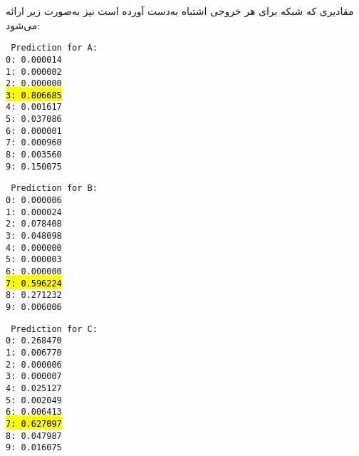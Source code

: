 مقادیری که شبکه برای هر خروجی اشتباه به‌دست آورده است نیز به‌صورت زیر ارائه می‌شود: \newpage


\begin{latin}
	\noindent\begin{multicols}{3}
		\texttt{%
			Prediction for A:\\
			0: 0.000014\\
			1: 0.000002\\
			2: 0.000000\\
			\hl{3: 0.806685}\\
			4: 0.001617\\
			5: 0.037086\\
			6: 0.000001\\
			7: 0.000960\\
			8: 0.003560\\
			9: 0.150075
		}
		
		\vfill %
		
		\texttt{%
			Prediction for B:\\
			0: 0.000006\\
			1: 0.000024\\
			2: 0.078408\\
			3: 0.048098\\
			4: 0.000000\\
			5: 0.000003\\
			6: 0.000000\\
			\hl{7: 0.596224}\\
			8: 0.271232\\
			9: 0.006006
		}
		
		\vfill %
		
		\texttt{%
			Prediction for C:\\
			0: 0.268470\\
			1: 0.006770\\
			2: 0.000006\\
			3: 0.000007\\
			4: 0.025127\\
			5: 0.002049\\
			6: 0.006413\\
			\hl{7: 0.627097}\\
			8: 0.047987\\
			9: 0.016075
		}
	\end{multicols}
\end{latin}



